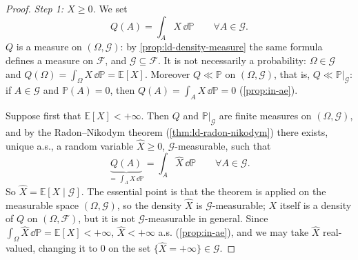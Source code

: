 \begin{proof}
\emph{Step 1: $X\ge0$.} We set
\[
  Q(A)=\int_AX\,\dd\mathbb P\qquad\forall A\in\mathcal G .
\]
$Q$ is a measure on $(\Omega,\mathcal G)$: by \cref{prop:ld-density-measure} the same formula
defines a measure on $\mathcal F$, and $\mathcal G\subseteq\mathcal F$. It is not necessarily a
probability: $\Omega\in\mathcal G$ and $Q(\Omega)=\int_\Omega X\,\dd\mathbb P=\mathbb E[X]$.
Moreover $Q\ll\mathbb P$ on $(\Omega,\mathcal G)$, that is, $Q\ll\mathbb P|_{\mathcal G}$: if
$A\in\mathcal G$ and $\mathbb P(A)=0$, then $Q(A)=\int_AX\,\dd\mathbb P=0$ (\cref{prop:in-ae}).

Suppose first that $\mathbb E[X]<+\infty$. Then $Q$ and $\mathbb P|_{\mathcal G}$ are finite
measures on $(\Omega,\mathcal G)$, and by the Radon--Nikodym theorem
(\cref{thm:ld-radon-nikodym}) there exists, unique a.s., a random variable $\hat X\ge0$,
$\mathcal G$-measurable, such that
\[
  \underbrace{Q(A)}_{=\,\int_AX\,\dd\mathbb P}=\int_A\hat X\,\dd\mathbb P\qquad\forall A\in\mathcal G .
\]
So $\hat X=\mathbb E[X\mid\mathcal G]$. The essential point is that the theorem is applied on the
measurable space $(\Omega,\mathcal G)$, so the density $\hat X$ is $\mathcal G$-measurable;
$X$ itself is a density of $Q$ on $(\Omega,\mathcal F)$, but it is not $\mathcal G$-measurable in
general. Since $\int_\Omega\hat X\,\dd\mathbb P=\mathbb E[X]<+\infty$, $\hat X<+\infty$ a.s.
(\cref{prop:in-ae}), and we may take $\hat X$ real-valued, changing it to $0$ on the set
$\{\hat X=+\infty\}\in\mathcal G$.


\end{proof}
